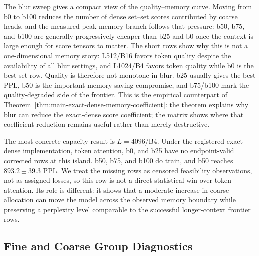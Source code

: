 \documentclass{article}
\theoremstyle{plain}
\theoremstyle{definition}
\theoremstyle{remark}
\begin{document}
The blur sweep gives a compact view of the quality--memory curve.  Moving from
b0 to b100 reduces the number of dense set--set scores contributed by coarse
heads, and the measured peak-memory branch follows that pressure: b50, b75,
and b100 are generally progressively cheaper than b25 and b0 once the context
is large enough for score tensors to matter.  The short rows show why this is
not a one-dimensional memory story: L512/B16 favors token quality despite the
availability of all blur settings, and L1024/B4 favors token quality while b0
is the best set row.  Quality is therefore not monotone in blur.  b25 usually
gives the best PPL, b50 is the important memory-saving compromise, and
b75/b100 mark the quality-degraded side of the frontier.  This is the
empirical counterpart of
Theorem~\ref{thm:main-exact-dense-memory-coefficient}: the theorem explains why blur can
reduce the exact-dense score coefficient; the matrix shows where that
coefficient reduction remains useful rather than merely destructive.

The most concrete capacity result is $L=4096$/B4.  Under the registered exact
dense implementation, token attention, b0, and b25 have no endpoint-valid
corrected rows at this island.  b50, b75, and b100 do train, and b50 reaches
$893.2\pm39.3$ PPL.  We treat the missing rows as censored feasibility
observations, not as assigned losses, so this row is not a direct statistical
win over token attention.  Its role is different: it shows that a moderate
increase in coarse allocation can move the model across the observed memory
boundary while preserving a perplexity level comparable to the successful
longer-context frontier rows.

\subsection{Fine and Coarse Group Diagnostics}
\label{sec:results-group-diagnostics}
\end{document}
